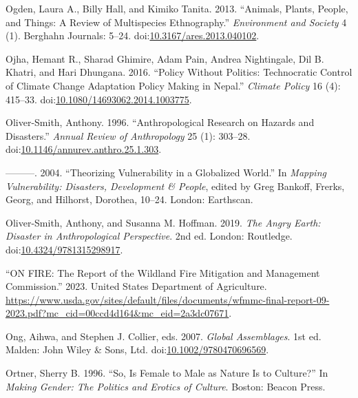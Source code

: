 \documentclass[
]{article}
\newlength{\cslhangindent}
\newenvironment{CSLReferences}[2] %
 {\begin{list}{}{%
  \setlength{\itemindent}{0pt}
  \setlength{\leftmargin}{0pt}
  \setlength{\parsep}{0pt}
  \ifodd #1
   \setlength{\leftmargin}{\cslhangindent}
   \setlength{\itemindent}{-1\cslhangindent}
  \fi
  \setlength{\itemsep}{#2\baselineskip}}}
 {\end{list}}
\begin{document}
\begin{CSLReferences}{1}{0}
Ogden, Laura A., Billy Hall, and Kimiko Tanita. 2013. {``Animals, {Plants}, {People}, and {Things}: {A Review} of {Multispecies Ethnography}.''} \emph{Environment and Society} 4 (1). Berghahn Journals: 5--24. doi:\href{https://doi.org/10.3167/ares.2013.040102}{10.3167/ares.2013.040102}.

Ojha, Hemant R., Sharad Ghimire, Adam Pain, Andrea Nightingale, Dil B. Khatri, and Hari Dhungana. 2016. {``Policy Without Politics: Technocratic Control of Climate Change Adaptation Policy Making in {Nepal}.''} \emph{Climate Policy} 16 (4): 415--33. doi:\href{https://doi.org/10.1080/14693062.2014.1003775}{10.1080/14693062.2014.1003775}.

Oliver-Smith, Anthony. 1996. {``Anthropological {Research} on {Hazards} and {Disasters}.''} \emph{Annual Review of Anthropology} 25 (1): 303--28. doi:\href{https://doi.org/10.1146/annurev.anthro.25.1.303}{10.1146/annurev.anthro.25.1.303}.

---------. 2004. {``Theorizing {Vulnerability} in a {Globalized World}.''} In \emph{Mapping {Vulnerability}: {Disasters}, {Development} \& {People}}, edited by Greg Bankoff, Frerks, Georg, and Hilhorst, Dorothea, 10--24. London: Earthscan.

Oliver-Smith, Anthony, and Susanna M. Hoffman. 2019. \emph{The {Angry Earth}: {Disaster} in {Anthropological Perspective}}. 2nd ed. London: Routledge. doi:\href{https://doi.org/10.4324/9781315298917}{10.4324/9781315298917}.

{``{ON FIRE}: {The Report} of the {Wildland Fire Mitigation} and {Management Commission}.''} 2023. United States Department of Agriculture. \url{https://www.usda.gov/sites/default/files/documents/wfmmc-final-report-09-2023.pdf?mc_cid=00ccd4d164&mc_eid=2a3dc07671}.

Ong, Aihwa, and Stephen J. Collier, eds. 2007. \emph{Global {Assemblages}}. 1st ed. Malden: John Wiley \& Sons, Ltd. doi:\href{https://doi.org/10.1002/9780470696569}{10.1002/9780470696569}.

Ortner, Sherry B. 1996. {``So, {Is Female} to {Male} as {Nature Is} to {Culture}?''} In \emph{Making {Gender}: {The Politics} and {Erotics} of {Culture}}. Boston: Beacon Press.


\end{CSLReferences}
\end{document}
